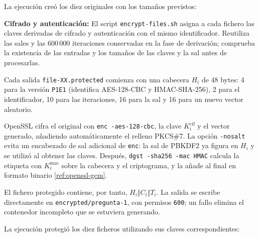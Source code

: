 La ejecución creó los diez originales con los tamaños previstos:

\noindent\begin{minipage}{\linewidth}
\begingroup
\renewcommand{\lstlistingname}{Salida y verificación}

\endgroup
\end{minipage}

\textbf{Cifrado y autenticación:} El script \texttt{encrypt-files.sh} asigna a cada fichero las claves derivadas de cifrado y autenticación con el mismo identificador.
Reutiliza las sales y las 600\,000 iteraciones conservadas en la fase de derivación; comprueba la existencia de las entradas y los tamaños de las claves y la sal antes de procesarlas.

Cada salida \texttt{file-XX.protected} comienza con una cabecera $H_i$ de 48 bytes: 4 para la versión \texttt{P1E1} (identifica AES-128-CBC y HMAC-SHA-256), 2 para el identificador, 10 para las iteraciones, 16 para la sal y 16 para un nuevo vector aleatorio.

OpenSSL cifra el original con \texttt{enc -aes-128-cbc}, la clave $K_i^{\mathrm{cif}}$ y el vector generado, añadiendo automáticamente el relleno PKCS\#7. La opción \texttt{-nosalt} evita un encabezado de sal adicional de \texttt{enc}: la sal de PBKDF2 ya figura en $H_i$ y se utilizó al obtener las claves.
Después, \texttt{dgst -sha256 -mac HMAC} calcula la etiqueta con $K_i^{\mathrm{mac}}$ sobre la cabecera y el criptograma, y la añade al final en formato binario \ref{ref:openssl-gcm}.

El fichero protegido contiene, por tanto, $H_i\Vert C_i\Vert T_i$. La salida se escribe directamente en \texttt{encrypted/pregunta-1}, con permisos \texttt{600}; un fallo elimina el contenedor incompleto que se estuviera generando.

\begingroup
\renewcommand{\lstlistingname}{Script}

\endgroup

La ejecución protegió los diez ficheros utilizando sus claves correspondientes:

\noindent\begin{minipage}{\linewidth}
\begingroup
\renewcommand{\lstlistingname}{Salida y verificación}

\endgroup
\end{minipage}

